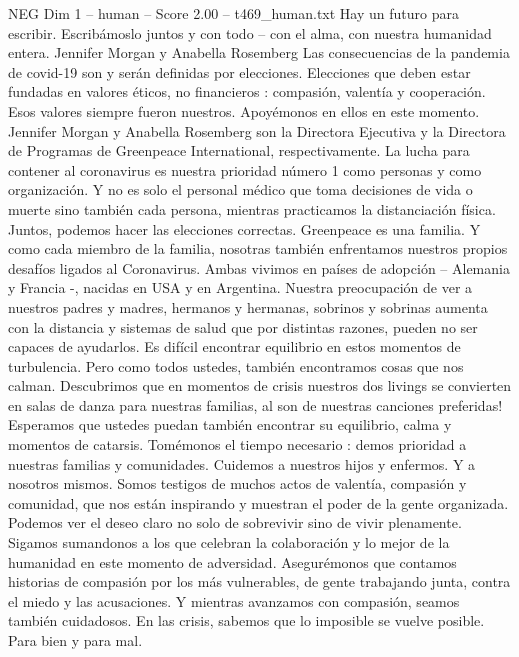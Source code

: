 \begin{textsample}{NEG Dim 1 – human – Score 2.00 – t469\_human.txt}
Hay un futuro para escribir.
Escribámoslo juntos y con todo – con el alma, con nuestra humanidad entera.
Jennifer Morgan y Anabella Rosemberg Las consecuencias de la pandemia de covid-19 son y serán definidas por elecciones.
Elecciones que deben estar fundadas en valores éticos, no financieros : compasión, valentía y cooperación.
Esos valores siempre fueron nuestros.
Apoyémonos en ellos en este momento.
Jennifer Morgan y Anabella Rosemberg son la Directora Ejecutiva y la Directora de Programas de Greenpeace International, respectivamente.
La lucha para contener al coronavirus es nuestra prioridad número 1 como personas y como organización.
Y no es solo el personal médico que toma decisiones de vida o muerte sino también cada persona, mientras practicamos la distanciación física.
Juntos, podemos hacer las elecciones correctas.
Greenpeace es una familia.
Y como cada miembro de la familia, nosotras también enfrentamos nuestros propios desafíos ligados al Coronavirus.
Ambas vivimos en países de adopción – Alemania y Francia -, nacidas en USA y en Argentina.
Nuestra preocupación de ver a nuestros padres y madres, hermanos y hermanas, sobrinos y sobrinas aumenta con la distancia y sistemas de salud que por distintas razones, pueden no ser capaces de ayudarlos.
Es difícil encontrar equilibrio en estos momentos de turbulencia.
Pero como todos ustedes, también encontramos cosas que nos calman.
Descubrimos que en momentos de crisis nuestros dos livings se convierten en salas de danza para nuestras familias, al son de nuestras canciones preferidas!
Esperamos que ustedes puedan también encontrar su equilibrio, calma y momentos de catarsis.
Tomémonos el tiempo necesario : demos prioridad a nuestras familias y comunidades.
Cuidemos a nuestros hijos y enfermos.
Y a nosotros mismos.
Somos testigos de muchos actos de valentía, compasión y comunidad, que nos están inspirando y muestran el poder de la gente organizada.
Podemos ver el deseo claro no solo de sobrevivir sino de vivir plenamente.
Sigamos sumandonos a los que celebran la colaboración y lo mejor de la humanidad en este momento de adversidad.
Asegurémonos que contamos historias de compasión por los más vulnerables, de gente trabajando junta, contra el miedo y las acusaciones.
Y mientras avanzamos con compasión, seamos también cuidadosos.
En las crisis, sabemos que lo imposible se vuelve posible.
Para bien y para mal.

\end{textsample}
